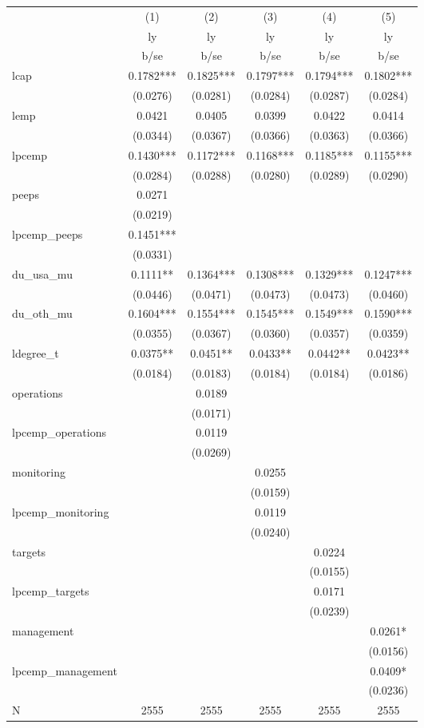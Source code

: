 \begin{tabular}{lccccc}
\toprule
 & (1) & (2) & (3) & (4) & (5) \\
 & ly & ly & ly & ly & ly \\
 & b/se & b/se & b/se & b/se & b/se \\
\midrule
lcap & 0.1782*** & 0.1825*** & 0.1797*** & 0.1794*** & 0.1802*** \\
 & (0.0276) & (0.0281) & (0.0284) & (0.0287) & (0.0284) \\
lemp & 0.0421 & 0.0405 & 0.0399 & 0.0422 & 0.0414 \\
 & (0.0344) & (0.0367) & (0.0366) & (0.0363) & (0.0366) \\
lpcemp & 0.1430*** & 0.1172*** & 0.1168*** & 0.1185*** & 0.1155*** \\
 & (0.0284) & (0.0288) & (0.0280) & (0.0289) & (0.0290) \\
peeps & 0.0271 &  &  &  &  \\
 & (0.0219) &  &  &  &  \\
lpcemp\_peeps & 0.1451*** &  &  &  &  \\
 & (0.0331) &  &  &  &  \\
du\_usa\_mu & 0.1111** & 0.1364*** & 0.1308*** & 0.1329*** & 0.1247*** \\
 & (0.0446) & (0.0471) & (0.0473) & (0.0473) & (0.0460) \\
du\_oth\_mu & 0.1604*** & 0.1554*** & 0.1545*** & 0.1549*** & 0.1590*** \\
 & (0.0355) & (0.0367) & (0.0360) & (0.0357) & (0.0359) \\
ldegree\_t & 0.0375** & 0.0451** & 0.0433** & 0.0442** & 0.0423** \\
 & (0.0184) & (0.0183) & (0.0184) & (0.0184) & (0.0186) \\
operations &  & 0.0189 &  &  &  \\
 &  & (0.0171) &  &  &  \\
lpcemp\_operations &  & 0.0119 &  &  &  \\
 &  & (0.0269) &  &  &  \\
monitoring &  &  & 0.0255 &  &  \\
 &  &  & (0.0159) &  &  \\
lpcemp\_monitoring &  &  & 0.0119 &  &  \\
 &  &  & (0.0240) &  &  \\
targets &  &  &  & 0.0224 &  \\
 &  &  &  & (0.0155) &  \\
lpcemp\_targets &  &  &  & 0.0171 &  \\
 &  &  &  & (0.0239) &  \\
management &  &  &  &  & 0.0261* \\
 &  &  &  &  & (0.0156) \\
lpcemp\_management &  &  &  &  & 0.0409* \\
 &  &  &  &  & (0.0236) \\
\midrule
N & 2555 & 2555 & 2555 & 2555 & 2555 \\
\bottomrule
\end{tabular}
